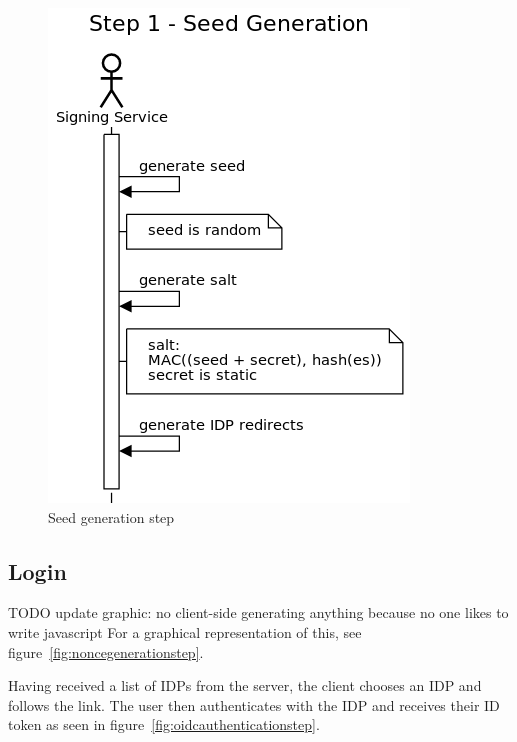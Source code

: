 \begin{figure}
    \begin{center}
        \includegraphics[scale=0.5]{images/protocol_step1_seed_generation.png}
        \caption{Seed generation step}
        \label{fig:seedgenerationstep}
    \end{center}
\end{figure}

\subsection{Login}\label{subsec:login}
TODO update graphic: no client-side generating anything because no one likes to write javascript
For a graphical representation of this, see figure~\ref{fig:noncegenerationstep}.

Having received a list of \gls{IDP}s from the server, the client chooses an \gls{IDP} and follows the link.
The user then authenticates with the \gls{IDP} and receives their ID token as seen in figure~\ref{fig:oidcauthenticationstep}.

